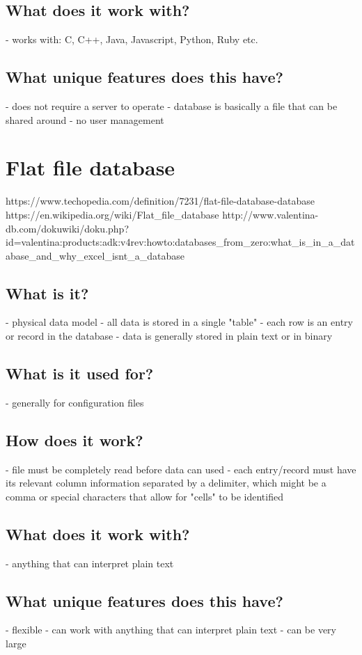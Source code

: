 \section{What does it work with?}
- works with: C, C++, Java, Javascript, Python, Ruby etc.

\section{What unique features does this have?}
- does not require a server to operate
- database is basically a file that can be shared around
- no user management

\chapter{Flat file database}
https://www.techopedia.com/definition/7231/flat-file-database-database
https://en.wikipedia.org/wiki/Flat_file_database
http://www.valentina-db.com/dokuwiki/doku.php?id=valentina:products:adk:v4rev:howto:databases_from_zero:what_is_in_a_database_and_why_excel_isnt_a_database

\section{What is it?}
- physical data model
- all data is stored in a single "table"
- each row is an entry or record in the database
- data is generally stored in plain text or in binary

\section{What is it used for?}
- generally for configuration files

\section{How does it work?}
- file must be completely read before data can used
- each entry/record must have its relevant column information separated by a delimiter, which might be a comma or special characters that allow for "cells" to be identified

\section{What does it work with?}
- anything that can interpret plain text

\section{What unique features does this have?}
- flexible - can work with anything that can interpret plain text
- can be very large

